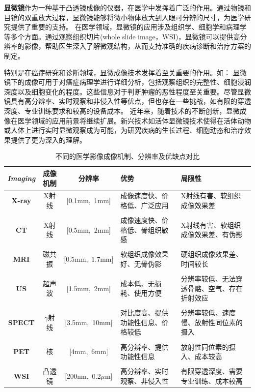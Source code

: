 \textbf{显微镜}\cite{haider1998electron}作为一种基于凸透镜成像的仪器，在医学中发挥着广泛的作用。通过物镜和目镜的双重放大过程，显微镜能够将微小物体放大到人眼可分辨的尺寸，为医学研究提供了重要的支持。
在医学领域，显微镜的应用涉及组织学、细胞学和病理学等多个方面。通过观察组织切片(whole slide image，WSI)，显微镜可以提供高分辨率的影像，帮助医生深入了解微观结构，从而支持准确的疾病诊断和治疗方案的制定。

特别是在癌症研究和诊断领域，显微成像技术发挥着至关重要的作用。如：
显微镜下的成像可用于对癌症病理学进行详细分析，包括观察组织的完整性、细胞浸润深度以及细胞变化的程度。这些信息对于判断肿瘤的恶性程度至关重要。尽管显微镜具有高分辨率、实时观察和非侵入性等优点，但也存在一些挑战，如有限的穿透深度、专业训练要求和较高的设备成本。
近年来，随着技术的不断创新，显微成像在医学领域的应用前景将继续扩展。新兴技术如活体显微镜技术使得在活体动物或人体上进行实时显微观察成为可能，为研究疾病的生长过程、细胞动态和治疗效果提供了更为深入的理解。
   \begin{table}[htbp]
      \centering
      \small
          \caption{不同的医学影像成像机制、分辨率及优缺点对比}\label{imaging_contrast}     
            \begin{tabular}{cccm{2.7cm}<{\centering}m{2.7cm}<{\centering}}
            \hline
            \textbf{\textit{Imaging}} &成像机制 &分辨率 &优势 &局限性  \\ \hline
            \textbf{X-ray} &X射线 &[0.1mm,~1mm]  &成像速度快、价格低、广泛应用  &X射线有害、软组织成像效果差  \\ \\
            \textbf{CT}	&X射线  &[0.5mm,~2mm]  &成像速度快、价格低、骨组织敏感  &X射线有害、软组织成像效果差、有伪影  \\ \\
            \textbf{MRI} &磁共振  &[0.5mm,~1.7mm]  &软组织成像效果好、无骨伪影  &硬组织成像效果差、时间较长  \\ \\
            \textbf{US}  &超声波  &[1.5mm,~2mm]  &成本低、无损耗、使用方便  &分辨率较低、无法穿透骨骼、空气、存在折射效应  \\ \\
            \textbf{SPECT} &$\gamma$射线  &[3.5mm,~10mm]  &对比度高、提供功能性信息、价格较低  &分辨率较低、速度慢、放射性同位素的摄入  \\ \\
            \textbf{PET} &核  &[4mm,~6mm]  &高分辨率、提供功能性信息  &放射性同位素的摄入、成本较高  \\ \\
            \textbf{WSI} &凸透镜  &[200nm,~0.2$\mu$m]  &高分辨率、实时观察、非侵入性  &有限穿透深度、需要专业训练、成本较高  \\  \hline
            \end{tabular} 
    \end{table}


